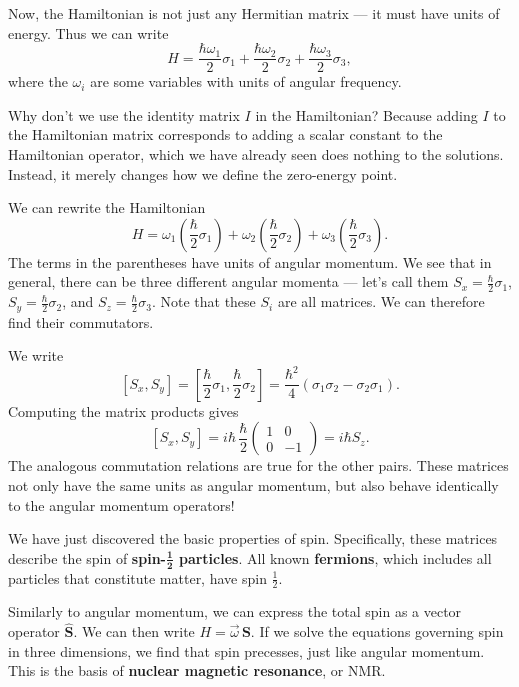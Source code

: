 Now, the Hamiltonian is not just any Hermitian matrix --- it must have units of energy. Thus we can write $$H=\frac{\hbar\omega_1}{2}\sigma_1+\frac{\hbar\omega_2}{2}\sigma_2+\frac{\hbar\omega_3}{2}\sigma_3,$$where the $\omega_i$ are some variables with units of angular frequency.

\begin{framedrmk*}
    Why don't we use the identity matrix $I$ in the Hamiltonian? Because adding $I$ to the Hamiltonian matrix corresponds to adding a scalar constant to the Hamiltonian operator, which we have already seen does nothing to the solutions. Instead, it merely changes how we define the zero-energy point. 
\end{framedrmk*}

We can rewrite the Hamiltonian $$H=\omega_1(\frac{\hbar}{2}\sigma_1)+\omega_2(\frac{\hbar}{2}\sigma_2)+\omega_3(\frac{\hbar}{2}\sigma_3).$$The terms in the parentheses have units of angular momentum. We see that in general, there can be three different angular momenta --- let's call them $S_x=\frac{\hbar}{2}\sigma_1$, $S_y=\frac{\hbar}{2}\sigma_2$, and $S_z=\frac{\hbar}{2}\sigma_3$. Note that these $S_i$ are all matrices. We can therefore find their commutators.

We write $$[S_x,S_y]=[\frac{\hbar}{2}\sigma_1,\frac{\hbar}{2}\sigma_2]=\frac{\hbar^2}{4}(\sigma_1\sigma_2-\sigma_2\sigma_1).$$Computing the matrix products gives $$[S_x,S_y]=i\hbar\,\frac{\hbar}{2}\begin{pmatrix}1&0 \\ 0 & -1\end{pmatrix}=i\hbar S_z.$$The analogous commutation relations are true for the other pairs. These matrices not only have the same units as angular momentum, but also behave identically to the angular momentum operators! 

\begin{framedrmk*}
    We have just discovered the basic properties of spin. Specifically, these matrices describe the spin of \textbf{spin-$\mathbf{\frac{1}{2}}$ particles}. All known \textbf{fermions}, which includes all particles that constitute matter, have spin $\frac{1}{2}$.
\end{framedrmk*}

\begin{framedrmk*}[NMR]
    Similarly to angular momentum, we can express the total spin as a vector operator $\hat{\mathbf{S}}$. We can then write $H=\vec{\omega}\,\mathbf{S}$. If we solve the equations governing spin in three dimensions, we find that spin precesses, just like angular momentum. This is the basis of \textbf{nuclear magnetic resonance}, or NMR.
\end{framedrmk*}


